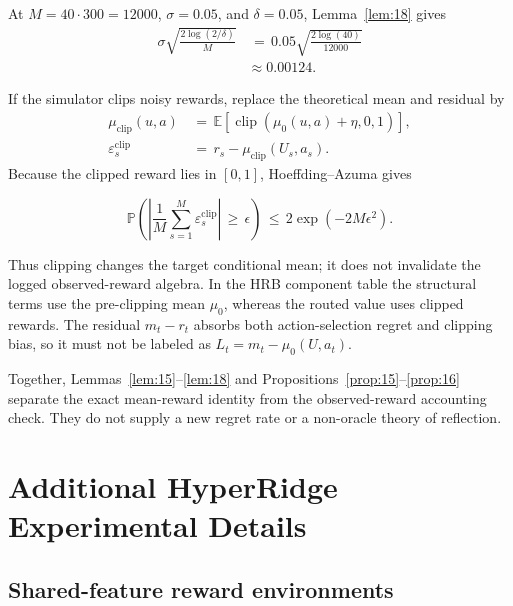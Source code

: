 \documentclass{article} %
\begin{document}
At \(M=40\cdot300=12000\), \(\sigma=0.05\), and \(\delta=0.05\),
Lemma~\ref{lem:18} gives
\begin{equation}
\begin{aligned}
\sigma\sqrt{\frac{2\log(2/\delta)}{M}}
&\,=\,
0.05\sqrt{\frac{2\log(40)}{12000}}
\\
&\approx
0.00124.
\end{aligned}
\end{equation}

If the simulator clips noisy rewards, replace the theoretical mean and
residual by
\begin{equation}
\begin{aligned}
\mu_{\mathrm{clip}}(u,a)
&\,=\,
\mathbb{E}\!\left[
\operatorname{clip}\!\left(\mu_0(u,a)+\eta,0,1\right)
\right],
\\
\varepsilon^{\mathrm{clip}}_s
&\,=\,
r_s-\mu_{\mathrm{clip}}(U_s,a_s).
\end{aligned}
\end{equation}
Because the clipped reward lies in \([0,1]\), Hoeffding--Azuma gives

\begin{equation}
\label{eq:app-six-clipped-tail}
\mathbb{P}\!\left(
\left|
\frac{1}{M}\sum_{s=1}^{M}\varepsilon^{\mathrm{clip}}_s
\right|
\,\ge\,
\epsilon
\right)
\,\le\,
2\exp(-2M\epsilon^2).
\end{equation}

Thus clipping changes the target conditional mean; it does not invalidate the
logged observed-reward algebra. In the HRB component table the structural terms use
the pre-clipping mean \(\mu_0\), whereas the routed value uses clipped rewards.
The residual \(m_t-r_t\) absorbs both action-selection regret and clipping
bias, so it must not be labeled as \(L_t=m_t-\mu_0(U,a_t)\).

Together, Lemmas~\ref{lem:15}--\ref{lem:18} and
Propositions~\ref{prop:15}--\ref{prop:16} separate the exact mean-reward
identity from the observed-reward accounting check. They do not supply a new
regret rate or a non-oracle theory of reflection.

\section{Additional HyperRidge Experimental Details}
\label{app:hyper-experiments}

\subsection{Shared-feature reward environments}
\end{document}
